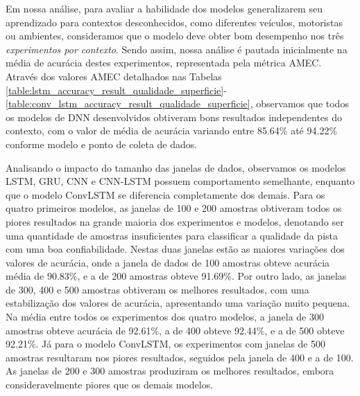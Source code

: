Em nossa análise, para avaliar a habilidade dos modelos generalizarem seu aprendizado para contextos desconhecidos, como diferentes veículos, motoristas ou ambientes, consideramos que o modelo deve obter bom desempenho nos três \emph{experimentos por contexto}. Sendo assim, nossa análise é pautada inicialmente na média de acurácia destes experimentos, representada pela métrica AMEC. Através dos valores AMEC detalhados nas Tabelas \ref{table:lstm_accuracy_result_qualidade_superficie}-\ref{table:conv_lstm_accuracy_result_qualidade_superficie}, observamos que todos os modelos de DNN desenvolvidos obtiveram bons resultados independentes do contexto, com o valor de média de acurácia variando entre 85.64\% até 94.22\% conforme modelo e ponto de coleta de dados.

Analisando o impacto do tamanho das janelas de dados, observamos os modelos LSTM, GRU, CNN e CNN-LSTM possuem comportamento semelhante, enquanto que o modelo ConvLSTM se diferencia completamente dos demais. Para os quatro primeiros modelos, as janelas de 100 e 200 amostras obtiveram todos os piores resultados na grande maioria dos experimentos e modelos, denotando ser uma quantidade de amostras insuficientes para classificar a qualidade da pista com uma boa confiabilidade. Nestas duas janelas estão as maiores variações dos valores de acurácia, onde a janela de dados de 100 amostras obteve acurácia média de 90.83\%, e a de 200 amostras obteve 91.69\%. Por outro lado, as janelas de 300, 400 e 500 amostras obtiveram os melhores resultados, com uma estabilização dos valores de acurácia, apresentando uma variação muito pequena. Na média entre todos os experimentos dos quatro modelos, a janela de 300 amostras obteve acurácia de 92.61\%, a de 400 obteve 92.44\%, e a de 500 obteve 92.21\%. Já para o modelo ConvLSTM, os experimentos com janelas de 500 amostras resultaram nos piores resultados, seguidos pela janela de 400 e a de 100. As janelas de 200 e 300 amostras produziram os melhores resultados, embora consideravelmente piores que os demais modelos.

